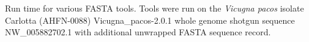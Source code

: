 Run time for various FASTA tools. Tools were run on the \textit{Vicugna pacos} isolate Carlotta (AHFN-0088) Vicugna_pacos-2.0.1 whole genome shotgun sequence NW_005882702.1 with additional unwrapped FASTA sequence record.
  